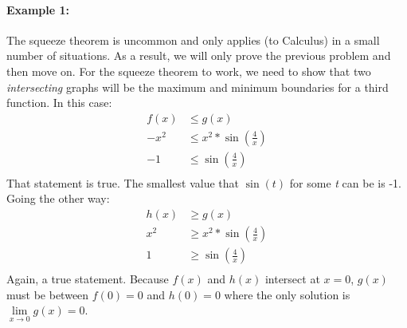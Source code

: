 \documentclass[../revisedMain.tex]{subfiles}
\begin{document}
	\newpage
\paragraph{Example 1:} The squeeze theorem is uncommon and only applies (to Calculus) in a small number of situations. As a result, we will only prove the previous problem and then move on. For the squeeze theorem to work, we need to show that two \textit{intersecting} graphs will be the maximum and minimum boundaries for a third function. In this case:
\begin{equation}
	\begin{split}
	f(x)&\le g(x)\\ 
	-x^2&\le x^2*\sin\left(\frac{4}{x}\right)\\
	-1&\le\sin\left(\frac{4}{x}\right)\\
	\end{split}
\end{equation}
That statement is true. The smallest value that \(\sin(t)\) for some \textit{t} can be is -1. Going the other way:
 \begin{equation}
 \begin{split}
 h(x)&\ge g(x)\\ 
 x^2&\ge x^2*\sin\left(\frac{4}{x}\right)\\
 1&\ge\sin\left(\frac{4}{x}\right)\\
 \end{split}
 \end{equation}
Again, a true statement. Because \(f(x)\) and \(h(x)\) intersect at \(x=0\), \(g(x)\) must be between \(f(0)=0\) and \(h(0)=0\) where the only solution is \(\lim\limits_{x\to 0}g(x)=0\).\\
\end{document}
